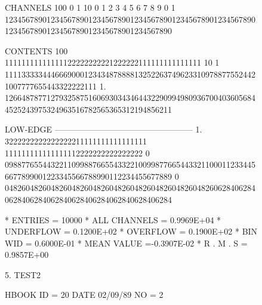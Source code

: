 \begin{figure}[p]
\begin{minipage}[t]{.55\textwidth}
\begin{XMPfrac}{3.5}
CHANNELS 100   0                                                                                                  1
          10   0        1         2         3         4         5         6         7         8         9         0
           1   1234567890123456789012345678901234567890123456789012345678901234567890123456789012345678901234567890
 
CONTENTS 100                             11111111111111122222222221222222111111111111111
          10           1 1111333334446669000123434878888132522637496233109788775524421007777655443322222111
           1.  1266487877127932587516069303434644322909949809367004036056844525243975324963516782565365312194856211
 
LOW-EDGE       --------------------------------------------------
           1.  3222222222222222211111111111111111                                 111111111111111112222222222222222
           0   0988776554432211099887665543322100998776654433211000112334456677899001223345566788990112234455677889
           0   0482604826048260482604826048260482604826048260482606284062840628406284062840628406284062840628406284
 
* ENTRIES =      10000      * ALL CHANNELS = 0.9969E+04      * UNDERFLOW = 0.1200E+02      * OVERFLOW = 0.1900E+02
* BIN WID = 0.6000E-01      * MEAN VALUE   =-0.3907E-02      * R . M . S = 0.9857E+00
\end{XMPfrac}
\end{minipage}\hfill
\begin{minipage}[t]{.425\textwidth}
\begin{XMPfrac}{5.}
TEST2
 
HBOOK     ID = 20        DATE  02/09/89          NO =  2
 

\end{XMPfrac}
\end{minipage}
\end{figure}
